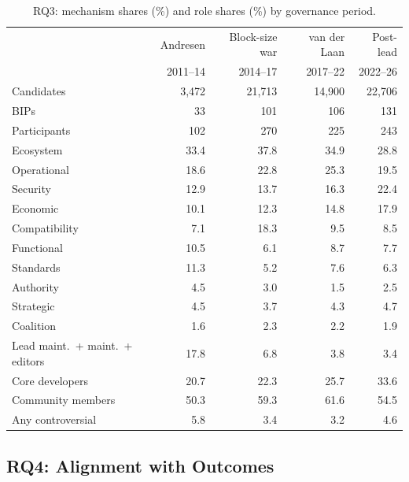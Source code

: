 \begin{table}[t]
\caption{RQ3: mechanism shares (\%) and role shares (\%) by governance period.}
\label{tab:eras}
\footnotesize
\setlength{\tabcolsep}{3pt}
\begin{tabular}{lrrrr}
\toprule
 & Andresen & Block-size war & van der Laan & Post-lead \\
 & 2011--14 & 2014--17 & 2017--22 & 2022--26 \\
\midrule
Candidates & 3,472 & 21,713 & 14,900 & 22,706 \\
BIPs & 33 & 101 & 106 & 131 \\
Participants & 102 & 270 & 225 & 243 \\
\midrule
Ecosystem & 33.4 & 37.8 & 34.9 & 28.8 \\
Operational & 18.6 & 22.8 & 25.3 & 19.5 \\
Security & 12.9 & 13.7 & 16.3 & 22.4 \\
Economic & 10.1 & 12.3 & 14.8 & 17.9 \\
Compatibility & 7.1 & 18.3 & 9.5 & 8.5 \\
Functional & 10.5 & 6.1 & 8.7 & 7.7 \\
Standards & 11.3 & 5.2 & 7.6 & 6.3 \\
Authority & 4.5 & 3.0 & 1.5 & 2.5 \\
Strategic & 4.5 & 3.7 & 4.3 & 4.7 \\
Coalition & 1.6 & 2.3 & 2.2 & 1.9 \\
\midrule
Lead maint.\ + maint.\ + editors & 17.8 & 6.8 & 3.8 & 3.4 \\
Core developers & 20.7 & 22.3 & 25.7 & 33.6 \\
Community members & 50.3 & 59.3 & 61.6 & 54.5 \\
\midrule
Any controversial & 5.8 & 3.4 & 3.2 & 4.6 \\
\bottomrule
\end{tabular}
\end{table}

\subsection{RQ4: Alignment with Outcomes}

